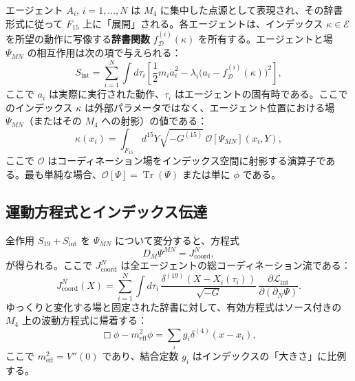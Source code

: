 \documentclass[11pt,a4paper]{article}
\DeclareMathOperator{\Tr}{Tr}
\begin{document}
	エージェント \(A_i\), \(i=1,\dots,N\) は \(M_4\) に集中した点源として表現され、その辞書形式に従って \(F_{15}\) 上に「展開」される。各エージェントは、インデックス \(\kappa \in \mathcal{E}\) を所望の動作に写像する\textbf{辞書関数} \(f_{\mathcal{D}}^{(i)}(\kappa)\) を所有する。エージェントと場 \(\Psi_{MN}\) の相互作用は次の項で与えられる：
	\begin{equation}
		S_{\mathrm{int}} = \sum_{i=1}^{N} \int d\tau_i \left[ \frac{1}{2} m_i \dot a_i^2 - \lambda_i \bigl( a_i - f_{\mathcal{D}}^{(i)}(\kappa) \bigr)^2 \right],
		\label{eq:Sint}
	\end{equation}
	ここで \(a_i\) は実際に実行された動作、\(\tau_i\) はエージェントの固有時である。ここでのインデックス \(\kappa\) は外部パラメータではなく、エージェント位置における場 \(\Psi_{MN}\)（またはその \(M_4\) への射影）の値である：
	\begin{equation}
		\kappa(x_i) = \int_{F_{15}} d^{15}Y \sqrt{-G^{(15)}}\, \mathcal{O}[\Psi_{MN}](x_i, Y),
		\label{eq:kappa}
	\end{equation}
	ここで \(\mathcal{O}\) はコーディネーション場をインデックス空間に射影する演算子である。最も単純な場合、\(\mathcal{O}[\Psi] = \Tr(\Psi)\) または単に \(\phi\) である。
	
	\subsection{運動方程式とインデックス伝達}
	
	全作用 \(S_{19} + S_{\mathrm{int}}\) を \(\Psi_{MN}\) について変分すると、方程式
	\begin{equation}
		D_M \Psi^{MN} = J^{N}_{\mathrm{coord}},
		\label{eq:Psi-eq}
	\end{equation}
	が得られる。ここで \(J^{N}_{\mathrm{coord}}\) は全エージェントの総コーディネーション流である：
	\begin{equation}
		J^{N}_{\mathrm{coord}}(X) = \sum_{i=1}^{N} \int d\tau_i\, \frac{\delta^{(19)}(X - X_i(\tau_i))}{\sqrt{-G}}\, \frac{\partial \mathcal{L}_{\mathrm{int}}}{\partial (\partial_N \Psi)}.
	\end{equation}
	ゆっくりと変化する場と固定された辞書に対して、有効方程式はソース付きの \(M_4\) 上の波動方程式に帰着する：
	\begin{equation}
		\Box \phi - m_{\mathrm{eff}}^2 \phi = \sum_{i} g_i \delta^{(4)}(x - x_i),
		\label{eq:phi-eq}
	\end{equation}
	ここで \(m_{\mathrm{eff}}^2 = V''(0)\) であり、結合定数 \(g_i\) はインデックスの「大きさ」に比例する。
	
\end{document}
